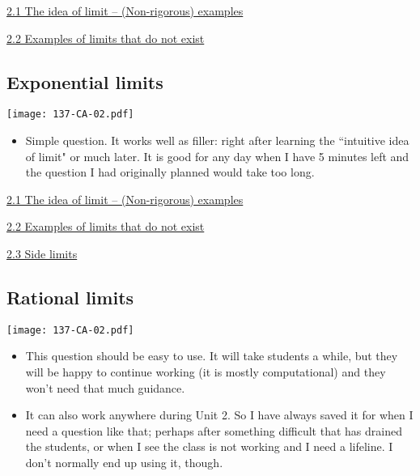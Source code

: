 \documentclass[11pt]{article}
\newcommand{\n}{\newpage}
\newcommand{\nl}{\hfill \vspace{-1.1\baselineskip}} %
\newcommand{\vi}{\hspace{8mm} \href{https://www.youtube.com/watch?v=UDGVvSXHLTQ&list=PLlwePzQY_wW8P_I8BFgm0-upywEwTKd8_&index=1}{2.1 The idea of limit -- (Non-rigorous) examples}}
\newcommand{\vii}{\hspace{8mm} \href{https://www.youtube.com/watch?v=bo2YmvSaTNI&list=PLlwePzQY_wW8P_I8BFgm0-upywEwTKd8_&index=3&t=0s}{2.2 Examples of limits that do not exist}}
\newcommand{\viii}{\hspace{8mm} \href{https://www.youtube.com/watch?v=299WBtK_qro&list=PLlwePzQY_wW8P_I8BFgm0-upywEwTKd8_&index=3}{2.3 Side limits}}
\begin{document}
\begin{videos}
\vi 

\vii
\end{videos}
\newpage
\subsection{Exponential limits} 

\begin{center}
{ \texttt{[image: 137-CA-02.pdf]}}
\end{center}

\begin{comments}
\nl
	\begin{itemize}
		\item  Simple question.  It works well as filler: right after learning the ``intuitive idea of limit" or much later.  It is good for any day when I have 5 minutes left and the question I had originally planned would take too long.
	\end{itemize}
\end{comments}

\begin{videos}
\vi 

\vii

\viii
\end{videos}

\n
\newpage
\subsection{Rational limits} 

\begin{center}
{ \texttt{[image: 137-CA-02.pdf]}}
\end{center}

\begin{comments}
\nl
	\begin{itemize}
		\item  This question should be easy to use.  It will take students a while, but they will be happy to continue working (it is mostly computational) and they won't need that much guidance. 
		\item It can also work anywhere during Unit 2.  So I have always saved it for when I need a question like that; perhaps after something difficult that has drained the students, or when I see the class is not working and I need a lifeline.  I don't normally end up using it, though.
	\end{itemize}
\end{comments}
\end{document}
